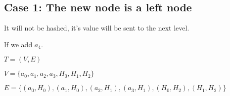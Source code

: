 \documentclass{article}
\begin{document}
\bigbreak

\subsection*{Case 1: The new node is a left node}

It will not be hashed, it's value will be sent to the next level.

\bigbreak

If we add $a_4$.

\bigbreak

$T = (V,E)$

\raggedright

\bigbreak

$V = \{a_0, a_1, a_2, a_3, H_0, H_1, H_2\}$

\bigbreak

$E = \{(a_0, H_0), (a_1, H_0), (a_2, H_1), (a_3, H_1), (H_0, H_2), (H_1, H_2)\}$

\bigbreak
\end{document}
